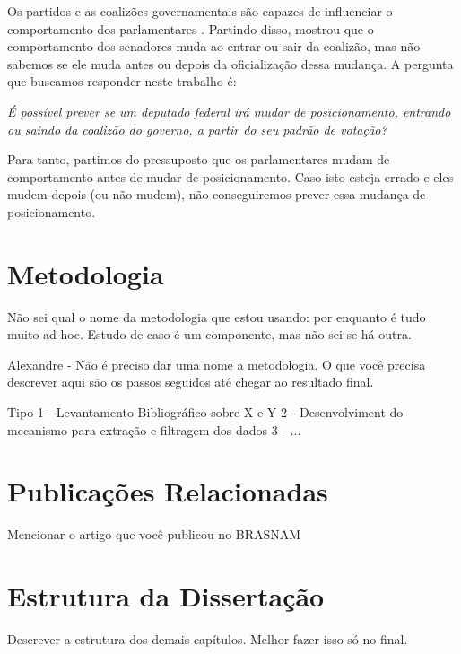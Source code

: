 Os partidos e as coalizões governamentais são capazes de influenciar o
comportamento dos parlamentares \cite{Figueiredo2001,Santos2003}. Partindo
disso,  mostrou que o comportamento dos senadores muda ao
entrar ou sair da coalizão, mas não sabemos se ele muda antes ou depois da
oficialização dessa mudança. A pergunta que buscamos responder neste trabalho
é:

\emph{É possível prever se um deputado federal irá mudar de posicionamento,
entrando ou saindo da coalizão do governo, a partir do seu padrão de votação?}

Para tanto, partimos do pressuposto que os parlamentares mudam de comportamento
antes de mudar de posicionamento. Caso isto esteja errado e eles mudem
depois (ou não mudem), não conseguiremos prever essa mudança de posicionamento.

\section{Metodologia}

Não sei qual o nome da metodologia que estou usando: por enquanto é tudo muito ad-hoc. Estudo de caso é um componente, mas não sei se há outra.

Alexandre -  Não é preciso dar uma nome a metodologia. O que você precisa descrever aqui são os passos seguidos até chegar ao resultado final.

Tipo
1 - Levantamento Bibliográfico sobre X e Y
2 - Desenvolviment do mecanismo para extração e filtragem dos dados
3 - ...

\section{Publicações Relacionadas}

Mencionar o artigo que você publicou no BRASNAM

\section{Estrutura da Dissertação}

Descrever a estrutura dos demais capítulos. Melhor fazer isso só no final.
